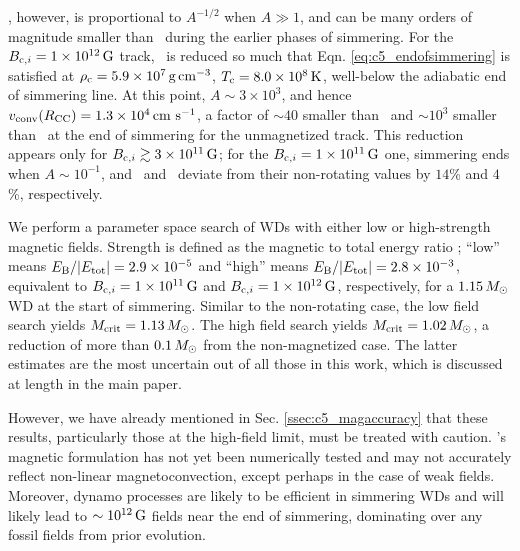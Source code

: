 \vconv, however, is proportional to $A^{-1/2}$ when $A \gg 1$, and can be many orders of magnitude smaller than \vconvzero\ during the earlier phases of simmering.  For the $\Binit = 1\times10^{12}\,\mrm{G}$ track, \vconv\ is reduced so much that Eqn. \ref{eq:c5_endofsimmering} is satisfied at $\rhoc = 5.9\times10^7\,\gcc$, $\Tc = 8.0\times10^8\,\mrm{K}$, well-below the adiabatic end of simmering line.  At this point, $A \sim 3\times10^3$, and hence $\vconvrcc = 1.3\times10^{4}\,\cmpsec$, a factor of $\sim40$ smaller than \vconvzero\ and $\sim10^3$ smaller than \vconvrcc\ at the end of simmering for the unmagnetized track.  This reduction appears only for $\Binit \gtrsim 3\times10^{11}\,\mrm{G}$; for the $\Binit = 1\times10^{11}\,\mrm{G}$ one, simmering ends when $A \sim 10^{-1}$, and \rhoc\ and \Tc\ deviate from their non-rotating values by $14$\% and $4$\%, respectively.


We perform a parameter space search of WDs with either low or high-strength magnetic fields.  Strength is defined as the magnetic to total energy ratio \EBEtot; ``low'' means $\EBEtot = 2.9\times10^{-5}$ and ``high'' means $\EBEtot = 2.8\times10^{-3}$, equivalent to $\Binit = 1\times10^{11}\,\mrm{G}$ and $\Binit = 1\times10^{12}\,\mrm{G}$, respectively, for a $1.15\,\Msun$ WD at the start of simmering.  Similar to the non-rotating case, the low field search yields $\Mcrit = 1.13\,\Msun$.  The high field search yields $\Mcrit = 1.02\,\Msun$, a reduction of more than $0.1\,\Msun$ from the non-magnetized case.  The latter estimates are the most uncertain out of all those in this work, which is discussed at length in the main paper.  




However, we have already mentioned in Sec. \ref{ssec:c5_magaccuracy} that these results, particularly those at the high-field limit, must be treated with caution.  \citeal{stev79}'s magnetic formulation has not yet been numerically tested and may not accurately reflect non-linear magnetoconvection, except perhaps in the case of weak fields.  Moreover, dynamo processes are likely to be efficient in simmering WDs and will likely lead to $\sim10^{12}\,\mathrm{G}$ fields near the end of simmering, dominating over any fossil fields from prior evolution.

